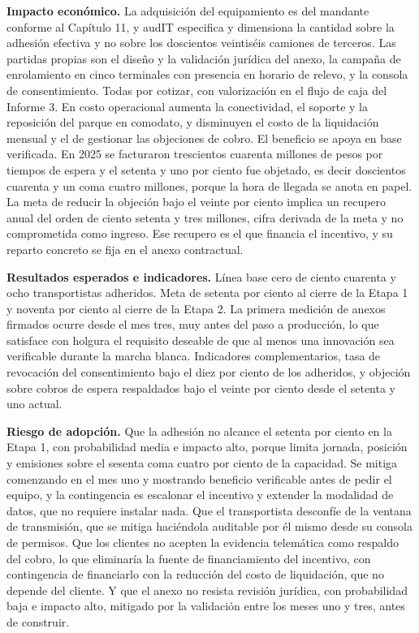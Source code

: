 \textbf{Impacto económico.} La adquisición del equipamiento es del mandante conforme al Capítulo
11, y audIT especifica y dimensiona la cantidad sobre la adhesión efectiva y no sobre los
doscientos veintiséis camiones de terceros. Las partidas propias son el diseño y la validación
jurídica del anexo, la campaña de enrolamiento en cinco terminales con presencia en horario de
relevo, y la consola de consentimiento. Todas por cotizar, con valorización en el flujo de caja del
Informe 3. En costo operacional aumenta la conectividad, el soporte y la reposición del parque en
comodato, y disminuyen el costo de la liquidación mensual y el de gestionar las objeciones de
cobro. El beneficio se apoya en base verificada. En 2025 se facturaron trescientos cuarenta
millones de pesos por tiempos de espera y el setenta y uno por ciento fue objetado, es decir
doscientos cuarenta y un coma cuatro millones, porque la hora de llegada se anota en papel. La meta
de reducir la objeción bajo el veinte por ciento implica un recupero anual del orden de ciento
setenta y tres millones, cifra derivada de la meta y no comprometida como ingreso. Ese recupero es
el que financia el incentivo, y su reparto concreto se fija en el anexo contractual.

\textbf{Resultados esperados e indicadores.} Línea base cero de ciento cuarenta y ocho transportistas
adheridos. Meta de setenta por ciento al cierre de la Etapa 1 y noventa por ciento al cierre de la
Etapa 2. La primera medición de anexos firmados ocurre desde el mes tres, muy antes del paso a
producción, lo que satisface con holgura el requisito deseable de que al menos una innovación sea
verificable durante la marcha blanca. Indicadores complementarios, tasa de revocación del
consentimiento bajo el diez por ciento de los adheridos, y objeción sobre cobros de espera
respaldados bajo el veinte por ciento desde el setenta y uno actual.

\textbf{Riesgo de adopción.} Que la adhesión no alcance el setenta por ciento en la Etapa 1, con
probabilidad media e impacto alto, porque limita jornada, posición y emisiones sobre el sesenta
coma cuatro por ciento de la capacidad. Se mitiga comenzando en el mes uno y mostrando beneficio
verificable antes de pedir el equipo, y la contingencia es escalonar el incentivo y extender la
modalidad de datos, que no requiere instalar nada. Que el transportista desconfíe de la ventana de
transmisión, que se mitiga haciéndola auditable por él mismo desde su consola de permisos. Que los
clientes no acepten la evidencia telemática como respaldo del cobro, lo que eliminaría la fuente de
financiamiento del incentivo, con contingencia de financiarlo con la reducción del costo de
liquidación, que no depende del cliente. Y que el anexo no resista revisión jurídica, con
probabilidad baja e impacto alto, mitigado por la validación entre los meses uno y tres, antes de
construir.

